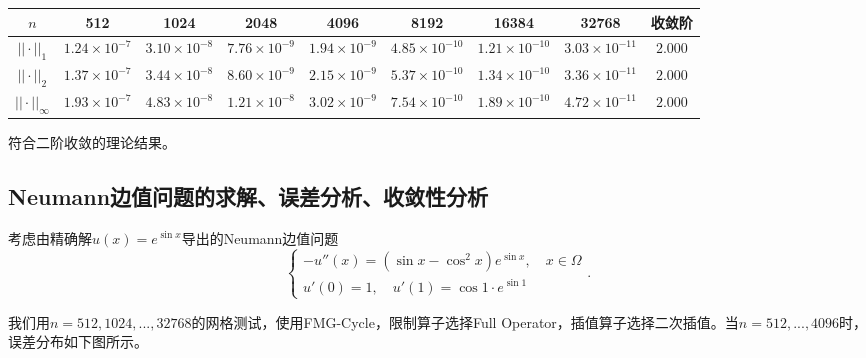 \documentclass[lang=cn,10pt]{elegantbook}
\begin{document}
\begin{table}[H]
  \centering
  \small
  \begin{tabular}{c|ccccccc|c}
  \textbf{$n$}        & 512                 & 1024                 & 2048                 & 4096                 & 8192                 & 16384                & 32768                & 收敛阶 \\ \hline
  $||\cdot||_1$      & $1.24\times 10^{-7}$ & $3.10\times 10^{-8}$ & $7.76\times 10^{-9}$ & $1.94\times 10^{-9}$ & $4.85\times 10^{-10}$ & $1.21\times 10^{-10}$ & $3.03\times 10^{-11}$ & $2.000$\\
  $||\cdot||_2$      & $1.37\times 10^{-7}$ & $3.44\times 10^{-8}$ & $8.60\times 10^{-9}$ & $2.15\times 10^{-9}$ & $5.37\times 10^{-10}$ & $1.34\times 10^{-10}$ & $3.36\times 10^{-11}$ & $2.000$\\
  $||\cdot||_\infty$ & $1.93\times 10^{-7}$ & $4.83\times 10^{-8}$ & $1.21\times 10^{-8}$ & $3.02\times 10^{-9}$ & $7.54\times 10^{-10}$ & $1.89\times 10^{-10}$ & $4.72\times 10^{-11}$ & $2.000$
  \end{tabular}
\end{table}

符合二阶收敛的理论结果。

\subsection{Neumann边值问题的求解、误差分析、收敛性分析}

考虑由精确解$u(x)=e^{\sin x}$导出的Neumann边值问题
\begin{equation}
  \left\{
    \begin{array}{l}
      -u''(x) = (\sin x-\cos^2 x)e^{\sin x},\quad x\in\Omega \\
      u'(0)=1,\quad u'(1)=\cos 1\cdot e^{\sin 1}
    \end{array}
  \right. .
\end{equation}

我们用$n=512,1024,...,32768$的网格测试，使用FMG-Cycle，限制算子选择Full Operator，插值算子选择二次插值。当$n=512,...,4096$时，误差分布如下图所示。
\end{document}
